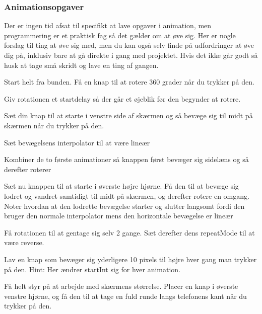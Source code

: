\subsubsection{Animationsopgaver}
Der er ingen tid afsat til specifikt at lave opgaver i animation, men programmering er et praktisk fag så det gælder om at øve sig. Her er nogle forslag til ting at øve sig med, men du kan også selv finde på udfordringer at øve dig på, inklusiv bare at gå direkte i gang med projektet. Hvis det ikke går godt så husk at tage små skridt og lave en ting af gangen.
\begin{exercise}
	Start helt fra bunden. Få en knap til at rotere 360 grader når du trykker på den.
\end{exercise}
\begin{exercise}
	Giv rotationen et startdelay så der går et øjeblik før den begynder at rotere.
\end{exercise}
\begin{exercise}
	Sæt din knap til at starte i venstre side af skærmen og så bevæge sig til midt på skærmen når du trykker på den.
\end{exercise}
\begin{exercise}
	Sæt bevægelsens interpolator til at være lineær
\end{exercise}
\begin{exercise}
	Kombiner de to første animationer så knappen først bevæger sig sidelæns og så derefter roterer
\end{exercise}
\begin{exercise}
	Sæt nu knappen til at starte i øverste højre hjørne. Få den til at bevæge sig lodret og vandret samtidigt til midt på skærmen, og derefter rotere en omgang. Noter hvordan at den lodrette bevægelse starter og slutter langsomt fordi den bruger den normale interpolator mens den horizontale bevægelse er lineær
\end{exercise}
\begin{exercise}
	Få rotationen til at gentage sig selv 2 gange. Sæt derefter dens repeatMode til at være reverse.
\end{exercise}
\begin{exercise}
	Lav en knap som bevæger sig yderligere 10 pixels til højre hver gang man trykker på den. Hint: Her ændrer startInt sig for hver animation.
\end{exercise}
\begin{exercise}
	Få helt styr på at arbejde med skærmens størrelse. Placer en knap i øverste venstre hjørne, og få den til at tage en fuld runde langs telefonens kant når du trykker på den. 
\end{exercise}

